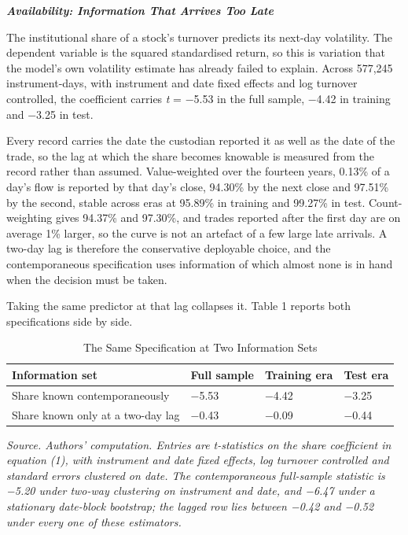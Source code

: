 \documentclass[12pt,a4paper]{article}
\newcommand{\subhead}[1]{%
  \par\vspace{6pt}\noindent\textbf{\textit{#1}}\par\vspace{1pt}}
\begin{document}
\subhead{Availability: Information That Arrives Too Late}

The institutional share of a stock's turnover predicts its next-day volatility. The dependent variable is the squared standardised return, so this is variation that the model's own volatility estimate has already failed to explain. Across 577,245 instrument-days, with instrument and date fixed effects and log turnover controlled, the coefficient carries \textit{t} = −5.53 in the full sample, −4.42 in training and −3.25 in test.

Every record carries the date the custodian reported it as well as the date of the trade, so the lag at which the share becomes knowable is measured from the record rather than assumed. Value-weighted over the fourteen years, 0.13\% of a day's flow is reported by that day's close, 94.30\% by the next close and 97.51\% by the second, stable across eras at 95.89\% in training and 99.27\% in test. Count-weighting gives 94.37\% and 97.30\%, and trades reported after the first day are on average 1\% larger, so the curve is not an artefact of a few large late arrivals. A two-day lag is therefore the conservative deployable choice, and the contemporaneous specification uses information of which almost none is in hand when the decision must be taken.

Taking the same predictor at that lag collapses it. Table 1 reports both specifications side by side.

\begin{table}[htbp]
\centering
\singlespacing
\caption{The Same Specification at Two Information Sets}
\begin{tabularx}{\textwidth}{>{\hsize=1.8000\hsize\RaggedRight\arraybackslash}X>{\hsize=0.7333\hsize\RaggedLeft\arraybackslash}X>{\hsize=0.7333\hsize\RaggedLeft\arraybackslash}X>{\hsize=0.7333\hsize\RaggedLeft\arraybackslash}X}
\toprule
\textbf{Information set} & \textbf{Full sample} & \textbf{Training era} & \textbf{Test era} \\
\midrule
Share known contemporaneously & −5.53 & −4.42 & −3.25 \\
Share known only at a two-day lag & −0.43 & −0.09 & −0.44 \\
\bottomrule
\end{tabularx}
\end{table}

{\footnotesize\textit{Source. Authors' computation. Entries are t-statistics on the share coefficient in equation (1), with instrument and date fixed effects, log turnover controlled and standard errors clustered on date. The contemporaneous full-sample statistic is −5.20 under two-way clustering on instrument and date, and −6.47 under a stationary date-block bootstrap; the lagged row lies between −0.42 and −0.52 under every one of these estimators.}}
\end{document}
